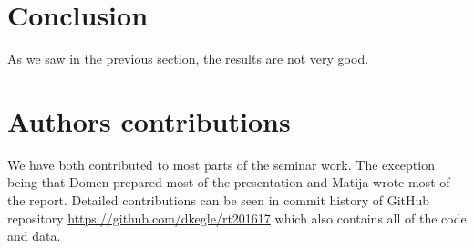 \documentclass[12pt,a4paper]{amsart}
\begin{document}
\section{Conclusion}

As we saw in the previous section, the results are not very good.



\section{Authors contributions}
We have both contributed to most parts of the seminar work. The exception being that Domen prepared most of the presentation and Matija wrote most of the report. Detailed contributions can be seen in commit history of GitHub repository \url{https://github.com/dkegle/rt201617} which also contains all of the code and data.




\end{document}
